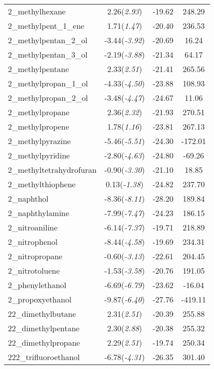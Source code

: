 \documentclass{amsart}
\begin{document}
\begin{center}
\begin{longtable}{l|c|c|c}
2\_methylhexane & 2.26(\textit{2.93}) & -19.62 & 248.29 \\ 
2\_methylpent\_1\_ene & 1.71(\textit{1.47}) & -20.40 & 236.53 \\ 
2\_methylpentan\_2\_ol & -3.44(\textit{-3.92}) & -20.69 & 16.24 \\ 
2\_methylpentan\_3\_ol & -2.19(\textit{-3.88}) & -21.34 & 64.17 \\ 
2\_methylpentane & 2.33(\textit{2.51}) & -21.41 & 265.56 \\ 
2\_methylpropan\_1\_ol & -4.33(\textit{-4.50}) & -23.88 & 108.93 \\ 
2\_methylpropan\_2\_ol & -3.48(\textit{-4.47}) & -24.67 & 11.06 \\ 
2\_methylpropane & 2.36(\textit{2.32}) & -21.93 & 270.51 \\ 
2\_methylpropene & 1.78(\textit{1.16}) & -23.81 & 267.13 \\ 
2\_methylpyrazine & -5.46(\textit{-5.51}) & -24.30 & -172.01 \\ 
2\_methylpyridine & -2.80(\textit{-4.63}) & -24.80 & -69.26 \\ 
2\_methyltetrahydrofuran & -0.90(\textit{-3.30}) & -21.10 & 18.85 \\ 
2\_methylthiophene & 0.13(\textit{-1.38}) & -24.82 & 237.70 \\ 
2\_naphthol & -8.36(\textit{-8.11}) & -28.20 & 189.84 \\ 
2\_naphthylamine & -7.99(\textit{-7.47}) & -24.23 & 186.15 \\ 
2\_nitroaniline & -6.14(\textit{-7.37}) & -19.71 & 218.89 \\ 
2\_nitrophenol & -8.44(\textit{-4.58}) & -19.69 & 234.31 \\ 
2\_nitropropane & -0.60(\textit{-3.13}) & -22.61 & 204.45 \\ 
2\_nitrotoluene & -1.53(\textit{-3.58}) & -20.76 & 191.05 \\ 
2\_phenylethanol & -6.69(\textit{-6.79}) & -23.62 & -16.04 \\ 
2\_propoxyethanol & -9.87(\textit{-6.40}) & -27.76 & -419.11 \\ 
22\_dimethylbutane & 2.31(\textit{2.51}) & -20.39 & 255.88 \\ 
22\_dimethylpentane & 2.30(\textit{2.88}) & -20.38 & 255.32 \\ 
22\_dimethylpropane & 2.29(\textit{2.51}) & -19.74 & 250.34 \\ 
222\_trifluoroethanol & -6.78(\textit{-4.31}) & -26.35 & 301.40 \\ 

\end{longtable}
\end{center}
\end{document}
